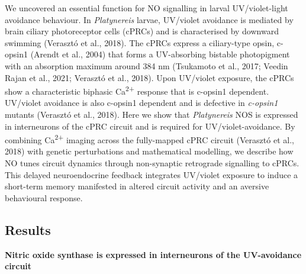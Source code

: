 \documentclass[
  10pt,
  onecolumn]{article}
\begin{document}
We uncovered an essential function for NO signalling in larval
UV/violet-light avoidance behaviour. In \emph{Platynereis} larvae,
UV/violet avoidance is mediated by brain ciliary photoreceptor cells
(cPRCs) and is characterised by downward swimming (Verasztó et al.,
2018). The cPRCs express a ciliary-type opsin, c-opsin1 (Arendt et al.,
2004) that forms a UV-absorbing bistable photopigment with an absorption
maximum around 384 nm (Tsukamoto et al., 2017; Veedin Rajan et al.,
2021; Verasztó et al., 2018). Upon UV/violet exposure, the cPRCs show a
characteristic biphasic Ca\textsuperscript{2+} response that is c-opsin1
dependent. UV/violet avoidance is also c-opsin1 dependent and is
defective in \emph{c-opsin1} mutants (Verasztó et al., 2018). Here we
show that \emph{Platynereis} NOS is expressed in interneurons of the
cPRC circuit and is required for UV/violet-avoidance. By combining
Ca\textsuperscript{2+} imaging across the fully-mapped cPRC circuit
(Verasztó et al., 2018) with genetic perturbations and mathematical
modelling, we describe how NO tunes circuit dynamics through
non-synaptic retrograde signalling to cPRCs. This delayed neuroendocrine
feedback integrates UV/violet exposure to induce a short-term memory
manifested in altered circuit activity and an aversive behavioural
response.

\hypertarget{results}{%
\subsection{Results}\label{results}}

\textbf{Nitric oxide synthase is expressed in interneurons of the
UV-avoidance circuit}
\end{document}
